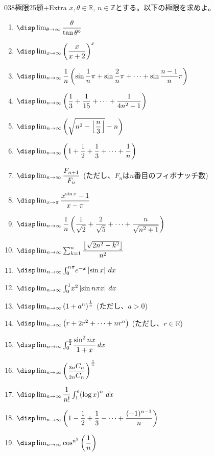 \begin{thm}{038}{}{極限25題+Extra}
 $x,\theta\in\mathbb{R}$, $n\in\mathbb{Z}$とする。以下の極限を求めよ。
 \begin{enumerate}
  \item $\disp \lim_{\theta\to\infty} \dfrac{\theta}{\tan\theta^\circ}$
  \item $\disp \lim_{x\to\infty} \left(\dfrac{x}{x+2}\right)^x$
  \item $\disp \lim_{n\to\infty} \dfrac{1}{n}\left(\sin\dfrac{1}{n}\pi+\sin\dfrac{2}{n}\pi+\cdots +\sin\dfrac{n-1}{n}\pi\right)$
  \item $\disp \lim_{n\to\infty}\left(\dfrac{1}{3}+\dfrac{1}{15}+\cdots+\dfrac{1}{4n^2-1}\right)$
  \item $\disp \lim_{n\to\infty} \left(\sqrt{n^2-\left\lfloor\dfrac{n}{3}\right\rfloor}-n\right)$
  \item $\disp \lim_{n\to\infty} \left(1+\dfrac{1}{2}+\dfrac{1}{3}+\cdots+\dfrac{1}{n}\right)$
  \item $\disp \lim_{n\to\infty} \dfrac{F_{n+1}}{F_n}$ (ただし、$F_n$は$n$番目のフィボナッチ数)
  \item $\disp \lim_{x\to\pi} \dfrac{x^{\sin x}-1}{x-\pi}$
  \item $\disp \lim_{n\to\infty }\dfrac{1}{n}\left(\dfrac{1}{\sqrt{2}}+\dfrac{2}{\sqrt{5}}+\cdots+\dfrac{n}{\sqrt{n^2+1}}\right)$
  \item $\disp \lim_{n\to\infty} \sum_{k=1}^n \dfrac{\left\lfloor\sqrt{2n^2-k^2}\right\rfloor}{n^2}$
  \item $\disp \lim_{n\to\infty} \int_0^{n\pi}\! e^{-x}\left|\sin x\right|\,dx$
  \item $\disp \lim_{n\to\infty} \int_0^1\! x^2\left|\sin n\pi x\right|\,dx$
  \item $\disp \lim_{n\to\infty} \left(1+a^n\right)^{\frac{1}{n}}$ (ただし、$a>0$)
  \item $\disp \lim_{n\to\infty} \left(r+2r^2+\cdots+nr^n\right)$ (ただし、$r\in\mathbb{R}$)
  \item $\disp \lim_{n\to\infty} \int_0^{\frac{\pi}{2}}\! \dfrac{\sin^2nx}{1+x} \,dx$
  \item $\disp \lim_{n\to\infty} \left(\dfrac{{}_{3n}C_n}{{}_{2n}C_n}\right)^\frac{1}{n}$
  \item $\disp \lim_{n\to\infty} \dfrac{1}{n!}\int_1^e\! \left(\log x\right)^n \,dx$
  \item $\disp \lim_{n\to\infty} \left(1-\dfrac{1}{2}+\dfrac{1}{3}-\cdots+\dfrac{(-1)^{n-1}}{n}\right)$
  \item $\disp \lim_{n\to\infty} \cos^{n^2}\left(\dfrac{1}{n}\right)$

\end{enumerate}
\end{thm}
